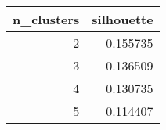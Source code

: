 \begin{tabular}{rr}
\toprule
 n\_clusters &  silhouette \\
\midrule
          2 &    0.155735 \\
          3 &    0.136509 \\
          4 &    0.130735 \\
          5 &    0.114407 \\
\bottomrule
\end{tabular}

